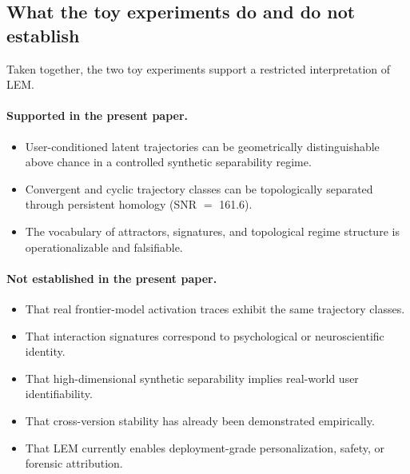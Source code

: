 \documentclass[11pt]{article}
\begin{document}
\subsection{What the toy experiments do and do not establish}

Taken together, the two toy experiments support a restricted interpretation of LEM.

\paragraph{Supported in the present paper.}
\begin{itemize}[leftmargin=1.8em]
  \item User-conditioned latent trajectories can be geometrically distinguishable
        above chance in a controlled synthetic separability regime.
  \item Convergent and cyclic trajectory classes can be topologically separated
        through persistent homology (SNR $=$ 161.6).
  \item The vocabulary of attractors, signatures, and topological regime structure
        is operationalizable and falsifiable.
\end{itemize}

\paragraph{Not established in the present paper.}
\begin{itemize}[leftmargin=1.8em]
  \item That real frontier-model activation traces exhibit the same trajectory
        classes.
  \item That interaction signatures correspond to psychological or neuroscientific
        identity.
  \item That high-dimensional synthetic separability implies real-world user
        identifiability.
  \item That cross-version stability has already been demonstrated empirically.
  \item That LEM currently enables deployment-grade personalization, safety, or
        forensic attribution.
\end{itemize}

\end{document}
